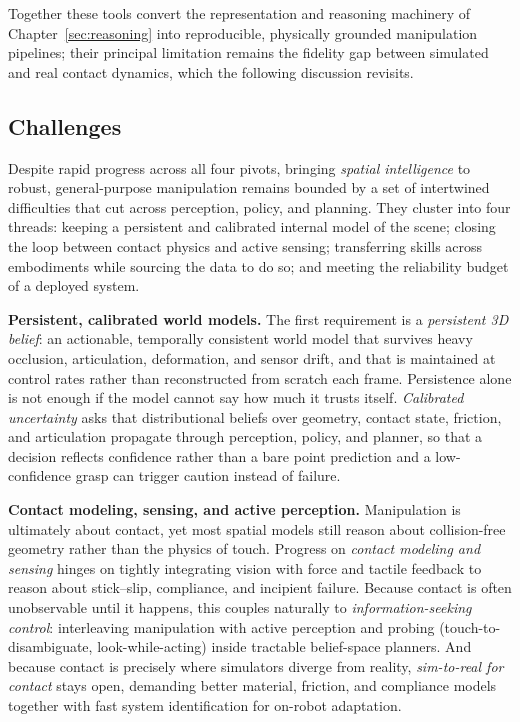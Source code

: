 Together these tools convert the representation and reasoning machinery of Chapter~\ref{sec:reasoning} into reproducible, physically grounded manipulation pipelines; their principal limitation remains the fidelity gap between simulated and real contact dynamics, which the following discussion revisits.


\subsection{Challenges}
\label{subsec:p4-sec9-1-challenges}

Despite rapid progress across all four pivots, bringing \emph{spatial intelligence} to robust, general-purpose manipulation remains bounded by a set of intertwined difficulties that cut across perception, policy, and planning. They cluster into four threads: keeping a persistent and calibrated internal model of the scene; closing the loop between contact physics and active sensing; transferring skills across embodiments while sourcing the data to do so; and meeting the reliability budget of a deployed system.

\textbf{Persistent, calibrated world models.} The first requirement is a \emph{persistent 3D belief}: an actionable, temporally consistent world model that survives heavy occlusion, articulation, deformation, and sensor drift, and that is maintained at control rates rather than reconstructed from scratch each frame. Persistence alone is not enough if the model cannot say how much it trusts itself. \emph{Calibrated uncertainty} asks that distributional beliefs over geometry, contact state, friction, and articulation propagate through perception, policy, and planner, so that a decision reflects confidence rather than a bare point prediction and a low-confidence grasp can trigger caution instead of failure.

\textbf{Contact modeling, sensing, and active perception.} Manipulation is ultimately about contact, yet most spatial models still reason about collision-free geometry rather than the physics of touch. Progress on \emph{contact modeling and sensing} hinges on tightly integrating vision with force and tactile feedback to reason about stick--slip, compliance, and incipient failure. Because contact is often unobservable until it happens, this couples naturally to \emph{information-seeking control}: interleaving manipulation with active perception and probing (touch-to-disambiguate, look-while-acting) inside tractable belief-space planners. And because contact is precisely where simulators diverge from reality, \emph{sim-to-real for contact} stays open, demanding better material, friction, and compliance models together with fast system identification for on-robot adaptation.

